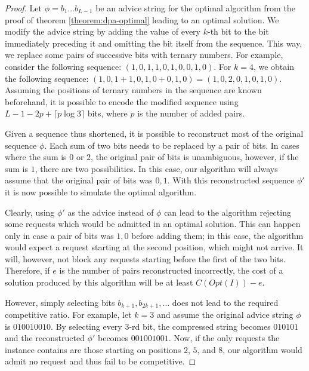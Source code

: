 \begin{proof}
    Let $\phi = b_1\dots{}b_{L-1}$ be an advice string for the optimal
    algorithm from the proof of theorem \ref{theorem:dpa-optimal} leading
    to an optimal solution. We modify the advice string by adding the
    value of every $k$-th bit to the bit immediately preceding it and
    omitting the bit itself from the sequence. This way, we replace some
    pairs of successive bits with ternary numbers. For example, consider
    the following sequence: $(1,0,1,1,0,1,0,0,1,0)$. For $k=4$, we obtain
    the following sequence: $(1,0,1+1,0,1,0+0,1,0) = (1,0,2,0,1,0,1,0)$.
    Assuming the positions of ternary numbers in the sequence are known
    beforehand, it is possible to encode the modified sequence using $L -
    1 - 2p + \lceil{}p\log{}3\rceil$ bits, where $p$ is the number of
    added pairs.

    Given a sequence thus shortened, it is possible to reconstruct most of
    the original sequence $\phi$. Each sum of two bits needs to be
    replaced by a pair of bits. In cases where the sum is $0$ or $2$, the
    original pair of bits is unambiguous, however, if the sum is $1$,
    there are two possibilities. In this case, our algorithm will always
    assume that the original pair of bits was $0, 1$. With this
    reconstructed sequence $\phi'$ it is now possible to simulate the
    optimal algorithm.

    Clearly, using $\phi'$ as the advice instead of $\phi$ can lead to the
    algorithm rejecting some requests which would be admitted in an
    optimal solution. This can happen only in case a pair of bits was
    $1, 0$ before adding them; in this case, the algorithm would expect a
    request starting at the second position, which might not arrive. It
    will, however, not block any requests starting before the first of the
    two bits. Therefore, if $e$ is the number of pairs reconstructed
    incorrectly, the cost of a solution produced by this algorithm will be
    at least $C(Opt(I)) - e$.

    However, simply selecting bits $b_{k+1}, b_{2k+1}, \dots$ does not lead to
    the required competitive ratio. For example, let $k = 3$ and assume
    the original advice string $\phi$ is $010010010$. By selecting every
    $3$-rd bit, the compressed string becomes $010101$ and the
    reconstructed $\phi'$ becomes $001001001$. Now, if the only requests
    the instance contains are those starting on positions $2$, $5$, and
    $8$, our algorithm would admit no request and thus fail to be
    competitive.


\end{proof}
